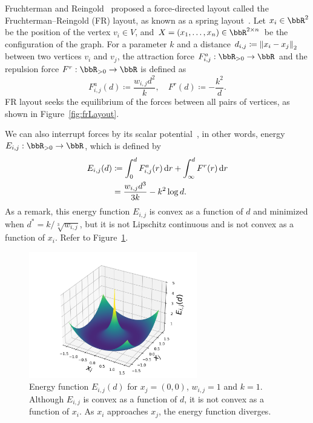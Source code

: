 \documentclass[dvipdfmx,lettersize,journal]{IEEEtran}
\newcommand{\defeq}{\coloneqq}
\begin{document}
Fruchterman and Reingold~\cite{fruchtermanGraphDrawingForcedirected1991} proposed a force-directed layout called the Fruchterman--Reingold (FR) layout, as known as a spring layout~\cite{osti_960616}.
Let $x_i \in \bbR^2$ be the position of the vertex $v_i \in V$, and $X = (x_1, \dots, x_n) \in \bbR^{2 \times n}$ be the configuration of the graph.
For a parameter $k$ and a distance $d_{i,j} \defeq \norm{x_i - x_j}_2$ between two vertices $v_i$ and $v_j$, the attraction force $F_{i,j}^a: \bbR_{> 0} \to \bbR$ and the repulsion force $F^r: \bbR_{> 0} \to \bbR$ is defined as
\begin{equation*}
  F_{i,j}^a(d) \defeq \frac{w_{i,j} d^2}{k}, \quad F^r(d) \defeq -\frac{k^2}{d}.
\end{equation*}
FR layout seeks the equilibrium of the forces between all pairs of vertices, as shown in Figure~\ref{fig:frLayout}.

We can also interrupt forces by its scalar potential~\cite{6183577}, in other words, energy $E_{i,j}: \bbR_{> 0} \to \bbR$, which is defined by
\begin{align}
  E_{i,j}(d) & \defeq \int_{0}^{d} F_{i,j}^a(r) \dd{r} + \int_{\infty}^{d} F^r(r) \dd{r} \notag \\
             & = \frac{w_{i,j} d^3}{3k} - k^2\log{d}. \label{eq:Eij}
\end{align}
As a remark, this energy function $E_{i,j}$ is convex as a function of $d$ and minimized when $d^* = k/\sqrt[3]{w_{i,j}}$, but it is not Lipschitz continuous and is not convex as a function of $x_i$. Refer to Figure~\ref{fig:energy3d}.

\begin{figure}[t]
  \centering
  \includegraphics[height=5.5cm]{energy_3d/energy_3d.png}
  \caption{Energy function $E_{i,j}(d)$ for $x_j=(0,0)$, $w_{i,j} = 1$ and $k = 1$. Although $E_{i,j}$ is convex as a function of $d$, it is not convex as a function of $x_i$. As $x_i$ approaches $x_j$, the energy function diverges.}
  \label{fig:energy3d}
\end{figure}
\end{document}

